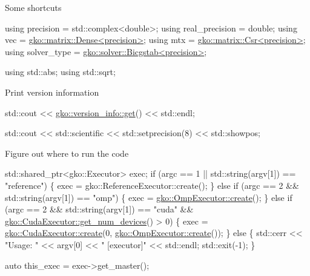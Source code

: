 Some shortcuts


\begin{DoxyCode}
\textcolor{keyword}{using} precision = std::complex<double>;
\textcolor{keyword}{using} real\_precision = double;
\textcolor{keyword}{using} vec = \hyperlink{classgko_1_1matrix_1_1Dense}{gko::matrix::Dense<precision>};
\textcolor{keyword}{using} mtx = \hyperlink{classgko_1_1matrix_1_1Csr}{gko::matrix::Csr<precision>};
\textcolor{keyword}{using} solver\_type = \hyperlink{classgko_1_1solver_1_1Bicgstab}{gko::solver::Bicgstab<precision>};

\textcolor{keyword}{using} std::abs;
\textcolor{keyword}{using} std::sqrt;
\end{DoxyCode}


Print version information


\begin{DoxyCode}
std::cout << \hyperlink{classgko_1_1version__info_a6daeb8a087cfb57fa055526fc133d8eb}{gko::version\_info::get}() << std::endl;

std::cout << std::scientific << std::setprecision(8) << std::showpos;
\end{DoxyCode}


Figure out where to run the code


\begin{DoxyCode}
std::shared\_ptr<gko::Executor> exec;
\textcolor{keywordflow}{if} (argc == 1 || std::string(argv[1]) == \textcolor{stringliteral}{"reference"}) \{
    exec = gko::ReferenceExecutor::create();
\} \textcolor{keywordflow}{else} \textcolor{keywordflow}{if} (argc == 2 && std::string(argv[1]) == \textcolor{stringliteral}{"omp"}) \{
    exec = \hyperlink{classgko_1_1OmpExecutor_a33ca05fdd0fc928ee262fc9425304874}{gko::OmpExecutor::create}();
\} \textcolor{keywordflow}{else} \textcolor{keywordflow}{if} (argc == 2 && std::string(argv[1]) == \textcolor{stringliteral}{"cuda"} &&
           \hyperlink{classgko_1_1CudaExecutor_aef0258494d14de0e56149b920c5173e5}{gko::CudaExecutor::get\_num\_devices}() > 0) \{
    exec = \hyperlink{classgko_1_1CudaExecutor_a2718a92034350650ef406ffdb60db090}{gko::CudaExecutor::create}(0, 
      \hyperlink{classgko_1_1OmpExecutor_a33ca05fdd0fc928ee262fc9425304874}{gko::OmpExecutor::create}());
\} \textcolor{keywordflow}{else} \{
    std::cerr << \textcolor{stringliteral}{"Usage: "} << argv[0] << \textcolor{stringliteral}{" [executor]"} << std::endl;
    std::exit(-1);
\}

\textcolor{keyword}{auto} this\_exec = exec->get\_master();
\end{DoxyCode}


